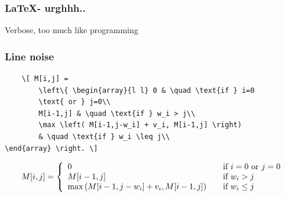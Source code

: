 \begin{frame}
	\frametitle{\LaTeX - urghhh..}
	\begin{center}
		\huge
		Verbose, too much like programming
	\end{center}
\end{frame}

\begin{frame}[fragile]
	\frametitle{Line noise}

	\begin{verbatim}
	\[ M[i,j] = 
		\left\{ \begin{array}{l l} 0 & \quad \text{if } i=0 
		\text{ or } j=0\\
		M[i-1,j] & \quad \text{if } w_i > j\\
		\max \left( M[i-1,j-w_i] + v_i, M[i-1,j] \right)
		& \quad \text{if } w_i \leq j\\
\end{array} \right. \]

	\end{verbatim}
	\[ M[i,j] = \left\{ \begin{array}{l l} 0 & \quad \text{if } i=0 \text{ or } j=0\\ M[i-1,j] & \quad \text{if } w_i > j\\ \max \left( M[i-1,j-w_i] + v_i, M[i-1,j] \right)& \quad \text{if } w_i \leq j\\ \end{array} \right. \]
\end{frame}


